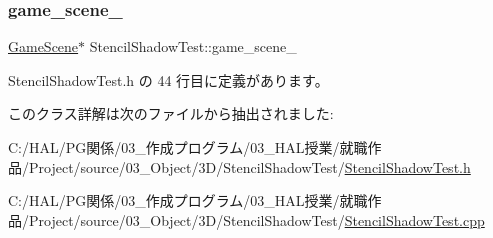\subsubsection{\texorpdfstring{game\+\_\+scene\+\_\+}{game\_scene\_}}
{\footnotesize\ttfamily \mbox{\hyperlink{class_game_scene}{Game\+Scene}}$\ast$ Stencil\+Shadow\+Test\+::game\+\_\+scene\+\_\+}



 Stencil\+Shadow\+Test.\+h の 44 行目に定義があります。



このクラス詳解は次のファイルから抽出されました\+:\begin{DoxyCompactItemize}
\item 
C\+:/\+H\+A\+L/\+P\+G関係/03\+\_\+作成プログラム/03\+\_\+\+H\+A\+L授業/就職作品/\+Project/source/03\+\_\+\+Object/3\+D/\+Stencil\+Shadow\+Test/\mbox{\hyperlink{_stencil_shadow_test_8h}{Stencil\+Shadow\+Test.\+h}}\item 
C\+:/\+H\+A\+L/\+P\+G関係/03\+\_\+作成プログラム/03\+\_\+\+H\+A\+L授業/就職作品/\+Project/source/03\+\_\+\+Object/3\+D/\+Stencil\+Shadow\+Test/\mbox{\hyperlink{_stencil_shadow_test_8cpp}{Stencil\+Shadow\+Test.\+cpp}}\end{DoxyCompactItemize}
